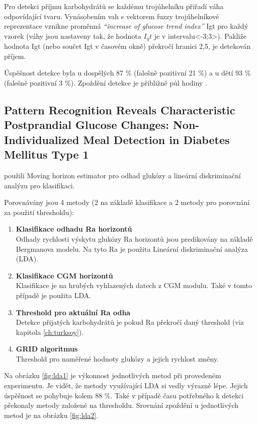 Pro detekci příjmu karbohydrátů se každému trojúhelníku přiřadí váha odpovídající tvaru. Vynásobením vah s vektorem fuzzy trojúhelníkové reprezentace vznikne proměnná \textit{“increase of glucose trend index”} Igt pro každý vzorek (váhy jsou nastaveny tak, že hodnota $I_gt$ je v intervalu<-3;3>). Pakliže hodnota Igt (nebo součet Igt v časovém okně) překročí hranici 2,5, je detekován příjem.

Úspěšnost detekce byla u dospělých 87 \% (falešně pozitivní 21 \%) a u dětí 93 \% (falešně pozitivní 3 \%). Zpoždění detekce je přibližně půl hodiny \citep{Analyza.WaveletEst}.


\subsection{Pattern Recognition Reveals Characteristic Postprandial Glucose Changes: Non-Individualized Meal Detection in Diabetes Mellitus Type 1}
\label{ch:lda}

\citet{Analyza.LDA} použili Moving horizon estimator pro odhad glukózy a lineární diskriminační analýzu pro klasifikaci.

Porovnávány jsou 4 metody (2 na základě klasifikace a 2 metody pro porovnání za použití thresholdu):

\begin{enumerate}
\item \textbf{Klasifikace odhadu Ra horizontů} \\
Odhady rychlosti výskytu glukózy Ra horizontů jsou predikovány na základě Bergmanova modelu. Na tyto Ra je použita Lineární diskriminační analýza (LDA).
\item \textbf{Klasifikace CGM horizontů} \\
Klasifikace je na hrubých vyhlazených datech z CGM modulu. Také v tomto případě je použita LDA.
\item \textbf{Threshold pro aktuální Ra odha} \\
Detekce přijatých karbohydrátů je pokud Ra překročí daný threshold (viz kapitola \ref{ch:turksoy}).
\item \textbf{GRID algoritmus} \\
Threshold pro naměřené hodnoty glukózy a jejich rychlost změny.
\end{enumerate}

Na obrázku \ref{fig:lda1} je výkonnost jednotlivých metod při provedeném experimentu. Je vidět, že metody využívající LDA si vedly výrazně lépe. Jejich úspěšnost se pohybuje kolem 88 \%. Také v případě času potřebného k detekci překonaly metody založené na thresholdu. Srovnání zpoždění u jednotlivých metod je na obrázku \ref{fig:lda2}.

